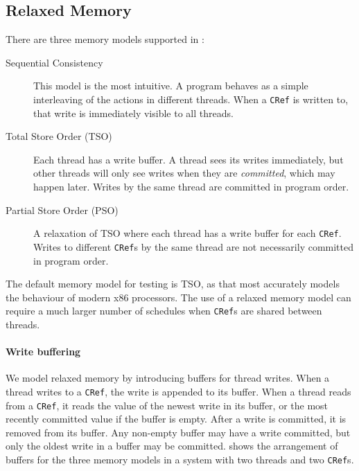 \subsection{Relaxed Memory}

There are three memory models supported in \dejafu{}:

\begin{description}
\item[Sequential Consistency] This model is the most intuitive.  A program
  behaves as a simple interleaving of the actions in different threads.  When a
  \texttt{CRef} is written to, that write is immediately visible to all
  threads.

\item[Total Store Order (TSO)] Each thread has a write buffer.  A thread sees
  its writes immediately, but other threads will only see writes when they are
  \emph{committed}, which may happen later.  Writes by the same thread are
  committed in program order.

\item[Partial Store Order (PSO)] A relaxation of TSO where each thread has a
  write buffer for each \verb|CRef|.  Writes to different \verb|CRef|s by the
  same thread are not necessarily committed in program order.
\end{description}

The default memory model for testing is TSO, as that most accurately
models the behaviour of modern x86 processors\cite{owens2009}.  The
use of a relaxed memory model can require a much larger number of
schedules when \verb|CRef|s are shared between threads.

\paragraph{Write buffering}
We model relaxed memory by introducing buffers for thread writes.  When a thread
writes to a \verb|CRef|, the write is appended to its buffer.  When a thread
reads from a \verb|CRef|, it reads the value of the newest write in its buffer,
or the most recently committed value if the buffer is empty.  After a write is
committed, it is removed from its buffer.  Any non-empty buffer may have a write
committed, but only the oldest write in a buffer may be committed.  
shows the arrangement of buffers for the three memory models in a system with
two threads and two \verb|CRef|s.

